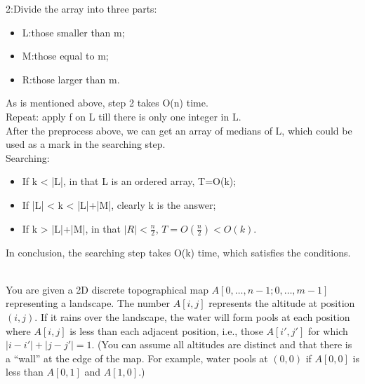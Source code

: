 \documentclass{oxmathproblems}
\begin{document}
\begin{questions}
{        2:Divide the array into three parts: 
        \begin{itemize}
            \item L:those smaller than m;
            \item M:those equal to m;
            \item R:those larger than m.
        \end{itemize}
        As is mentioned above, step 2 takes O(n) time.\\
        Repeat: apply f on L till there is only one integer in L.\\
        After the preprocess above, we can get an array of medians of L, which could be used as a mark in the searching step.\\
        Searching:
        \begin{itemize}
            \item If k < |L|, in that L is an ordered array, T=O(k);
            \item If |L| < k < |L|+|M|, clearly k is the answer;
            \item If k > |L|+|M|, in that $|R| < \frac{n}{2}$, $T=O(\frac{n}{2})<O(k)$.
        \end{itemize}
        In conclusion, the searching step takes O(k) time, which satisfies the conditions.}\\

\miquestion[26]
You are given a 2D discrete topographical map $A[0,\ldots,n-1;0,\ldots,m-1]$ representing a landscape. The number $A[i,j]$ represents the altitude at position $(i,j)$. If it rains over the landscape, the water will form pools at each position where $A[i,j]$ is less than each adjacent position, i.e., those $A[i',j']$ for which $|i-i'|+|j-j'|=1$. (You can assume all altitudes are distinct and that there is a ``wall'' at the edge of the map. For example, water pools at $(0,0)$ if $A[0,0]$ is less than $A[0,1]$ and $A[1,0]$.)
\end{questions}
\end{document}
